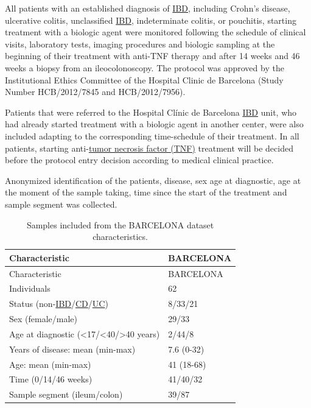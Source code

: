 \documentclass[
  12pt,
  a4paper,
  twoside,
  openright]{book}
\begin{document}
All patients with an established diagnosis of \protect\hyperlink{acronyms_IBD}{IBD}, including Crohn's disease, ulcerative colitis, unclassified \protect\hyperlink{acronyms_IBD}{IBD}, indeterminate colitis, or pouchitis, starting treatment with a biologic agent were monitored following the schedule of clinical visits, laboratory tests, imaging procedures and biologic sampling at the beginning of their treatment with anti-TNF therapy and after 14 weeks and 46 weeks a biopsy from an ileocolonoscopy.
The protocol was approved by the Institutional Ethics Committee of the Hospital Clinic de Barcelona (Study Number HCB/2012/7845 and HCB/2012/7956).

Patients that were referred to the Hospital Clínic de Barcelona \protect\hyperlink{acronyms_IBD}{IBD} unit, who had already started treatment with a biologic agent in another center, were also included adapting to the corresponding time-schedule of their treatment.
In all patients, starting anti-\protect\hyperlink{acronyms_TNF}{tumor necrosis factor (TNF)} treatment will be decided before the protocol entry decision according to medical clinical practice.

Anonymized identification of the patients, disease, sex age at diagnostic, age at the moment of the sample taking, time since the start of the treatment and sample segment was collected.

\begin{longtable}[]{@{}ll@{}}
\caption{\label{tab:BARCELONA} Samples included from the BARCELONA dataset characteristics.}\tabularnewline
\toprule
Characteristic & BARCELONA \\
\midrule
\endfirsthead
\toprule
Characteristic & BARCELONA \\
\midrule
\endhead
Individuals & 62 \\
Status (non-\protect\hyperlink{acronyms_IBD}{IBD}/\protect\hyperlink{acronyms_CD}{CD}/\protect\hyperlink{acronyms_UC}{UC}) & 8/33/21 \\
Sex (female/male) & 29/33 \\
Age at diagnostic (\textless17/\textless40/\textgreater40 years) & 2/44/8 \\
Years of disease: mean (min-max) & 7.6 (0-32) \\
Age: mean (min-max) & 41 (18-68) \\
Time (0/14/46 weeks) & 41/40/32 \\
Sample segment (ileum/colon) & 39/87 \\
\bottomrule
\end{longtable}
\end{document}
